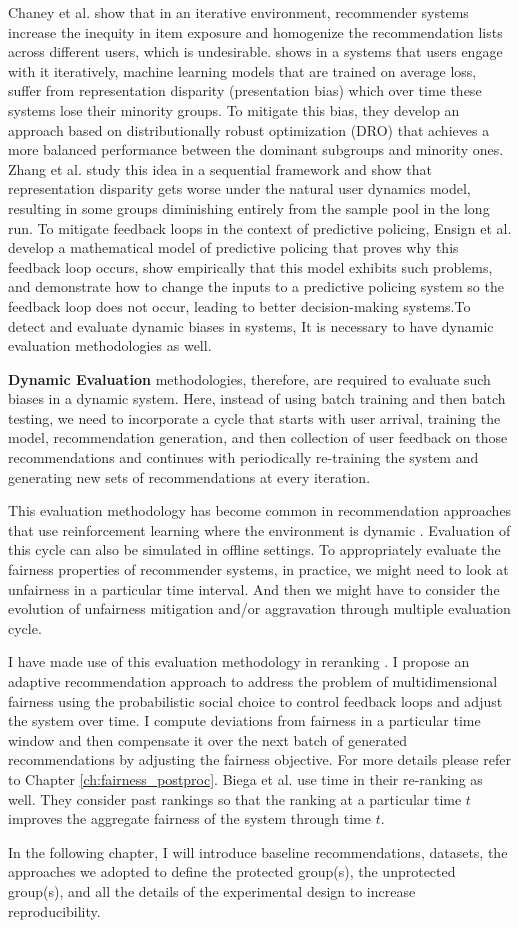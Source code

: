     Chaney et al. \cite{Chaney2018Homo} show that in an iterative environment, recommender systems increase the inequity in item exposure and homogenize the recommendation lists across different users, which is undesirable. \cite{pmlr-v80-hashimoto18a} shows in a systems that users engage with it iteratively, machine learning models that are trained on average loss, suffer from representation disparity (presentation bias) which over time these systems lose their minority groups. To mitigate this bias, they develop an approach based on distributionally robust optimization (DRO) that achieves a more balanced performance between the dominant subgroups and minority ones. Zhang et al. \cite{NEURIPS2019_7690dd4d} study this idea in a sequential framework and show that representation disparity gets worse under the natural user dynamics model, resulting in some groups diminishing entirely from the sample pool in the long run. To mitigate feedback loops in the context of predictive policing, Ensign et al. \cite{pmlr-v81-ensign18a} develop a mathematical model of predictive policing that proves why this feedback loop occurs, show empirically that this model exhibits such problems, and demonstrate how to change the inputs to a predictive policing system so the feedback loop does not occur, leading to better decision-making systems.To detect and evaluate dynamic biases in systems, It is necessary to have dynamic evaluation methodologies as well.
    
    \textbf{Dynamic Evaluation} methodologies, therefore, are required to evaluate such biases in a dynamic system. Here, instead of using batch training and then batch testing, we need to incorporate a cycle that starts with user arrival, training the model, recommendation generation, and then collection of user feedback on those recommendations and continues with periodically re-training the system and generating new sets of recommendations at every iteration.
    
    This evaluation methodology has become common in recommendation approaches that use reinforcement learning where the environment is dynamic \cite{Lihong2010bandit,Zheng2018DRN}. Evaluation of this cycle can also be simulated in offline settings. To appropriately evaluate the fairness properties of recommender systems, in practice, we might need to look at unfairness in a particular time interval. And then we might have to consider the evolution of unfairness mitigation and/or aggravation through multiple evaluation cycle.
    
    I have made use of this evaluation methodology in reranking \cite{sonboli2020dynm}. I propose an adaptive recommendation approach to address the problem of multidimensional fairness using the probabilistic social choice to control feedback loops and adjust the system over time. I compute deviations from fairness in a particular time window and then compensate it over the next batch of generated recommendations by adjusting the fairness objective. For more details please refer to Chapter \ref{ch:fairness_postproc}. Biega et al. \cite{biega2018equity} use time in their re-ranking as well. They consider past rankings so that the ranking at a particular time $t$ improves the aggregate fairness of the system through time $t$.
    
    
    In the following chapter, I will introduce baseline recommendations, datasets, the approaches we adopted to define the protected group(s), the unprotected group(s), and all the details of the experimental design to increase reproducibility.